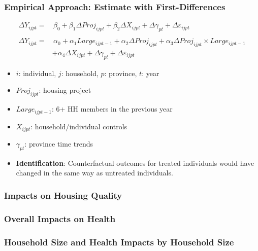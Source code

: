 \documentclass[aspectratio=149]{beamer}
\begin{document}

\begin{frame}
\frametitle{Empirical Approach: Estimate with First-Differences}

\begin{align*}
\Delta Y_{ijpt}  =& \, \beta_0 + \beta_1 \Delta Proj_{ijpt} + \beta_2 \Delta X_{ijpt} + \Delta \gamma_{pt} + \Delta \varepsilon_{ijpt} \\
&\\
\Delta Y_{ijpt}  =& \, \alpha_0 + \alpha_1 Large_{ijpt-1} + \alpha_2 \Delta  Proj_{ijpt} + \alpha_3 \Delta Proj_{ijpt} \times Large_{ijpt-1} \\ 
 &+ \alpha_4 \Delta X_{ijpt}  + \Delta \gamma_{pt} + \Delta \varepsilon_{ijpt} 
\end{align*}
\begin{itemize}
  \item $i$: individual, $j$: household, $p$: province, $t$: year
  \item $Proj_{ijpt}$: housing project
  \item $Large_{ijpt-1}$: 6+ HH members in the previous year
  \item $X_{ijpt}$: household/individual controls
  \item $\gamma_{pt}$: province time trends
\end{itemize}
\begin{itemize}
  \item \textbf{Identification}: Counterfactual outcomes for treated individuals would have changed in the same way as untreated individuals.
\end{itemize}
\end{frame}


\begin{frame}
\frametitle{Impacts on Housing Quality}
\resizebox{\textwidth}{!}{  

}
\end{frame}



\begin{frame}
\frametitle{Overall Impacts on Health}
\resizebox{\textwidth}{!}{  

}
\end{frame}

\begin{frame}
\frametitle{Household Size and Health Impacts by Household Size}
\resizebox{\textwidth}{!}{  

}
\end{frame}
\end{document}
